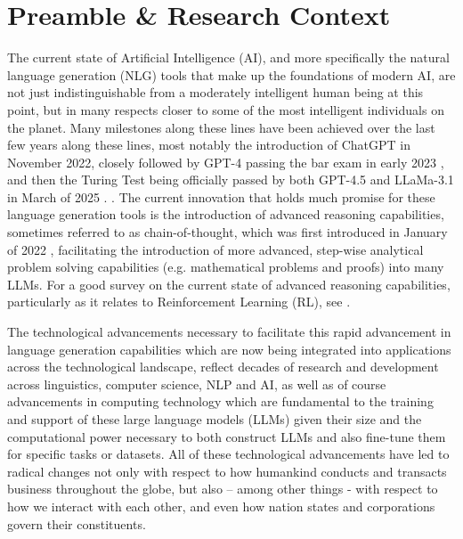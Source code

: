 \documentclass[final]{clv2025}
\begin{document}

\section{Preamble \& Research Context}

The current state of Artificial Intelligence (AI), and more specifically the natural language generation (NLG) tools that make up the foundations of modern AI, are not just indistinguishable from a moderately intelligent human being at this point, but in many respects closer to some of the most intelligent individuals on the planet. Many milestones along these lines have been achieved over the last few years along these lines, most notably the introduction of ChatGPT in November 2022, closely followed by GPT-4 passing the bar exam in early 2023 \cite{articlekatz}, and then the Turing Test being officially passed by both GPT-4.5 and LLaMa-3.1 in March of 2025 \cite{articlejones}. . The current innovation that holds much promise for these language generation tools is the introduction of advanced reasoning capabilities, sometimes referred to as chain-of-thought, which was first introduced in January of 2022 \cite{articlewei}, facilitating the introduction of more advanced, step-wise analytical  problem solving capabilities (e.g. mathematical problems and proofs) into many LLMs. For a good survey on the current state of advanced reasoning capabilities, particularly as it relates to Reinforcement Learning (RL), see \cite{xu2025towards}.

The technological advancements necessary to facilitate this rapid advancement in language generation capabilities which are now being integrated into applications across the technological landscape, reflect decades of research and development across linguistics, computer science, NLP and AI, as well as of course advancements in computing technology which are fundamental to the training and support of these large language models (LLMs) given their size and the computational power necessary to both construct LLMs and also fine-tune them for specific tasks or datasets. All of these technological advancements have led to radical changes not only with respect to how humankind conducts and transacts business throughout the globe, but also – among other things - with respect to how we interact with each other, and even how nation states and corporations govern their constituents. 
\end{document}
